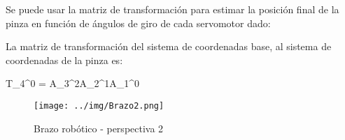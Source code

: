 \documentclass[gra_conf.tex]{subfiles}
\begin{document}
Se puede usar la matriz de transformación para estimar la posición final de la pinza en función de ángulos de giro de cada servomotor dado:


La matriz de transformación del sistema de coordenadas base, al sistema de coordenadas de la pinza es:

\centering
T_{4}^{0} = A_{3}^{2}A_{2}^{1}A_{1}^{0}


\begin{figure}[h]
\centering
  \texttt{[image: ../img/Brazo2.png]}
  \caption{Brazo robótico - perspectiva 2}
  \label{img:brazo2}
\end{figure}
\end{document}
